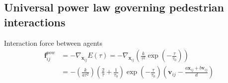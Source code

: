 \subsection{Universal power law governing pedestrian interactions}
Interaction force between agents
\begin{align}
\mathbf{f}_{ij}^{pow} &= -\nabla_{\mathbf{x}_{ij}} E(\tau) 
= -\nabla_{\mathbf{x}_{ij}} \left(\frac{k}{\tau^{2}} \exp \left( -\frac{\tau}{\tau_{0}} \right) \right) \\
&= - \left(\frac{k}{a \tau^{2}}\right) 
\left(\frac{2}{\tau} + \frac{1}{\tau_{0}}\right) 
\exp\left (-\frac{\tau}{\tau_{0}}\right )
\left(\mathbf{v}_{ij} -\frac{a \mathbf{x}_{ij} + b \mathbf{v}_{ij}}{d} \right) 
\end{align}



